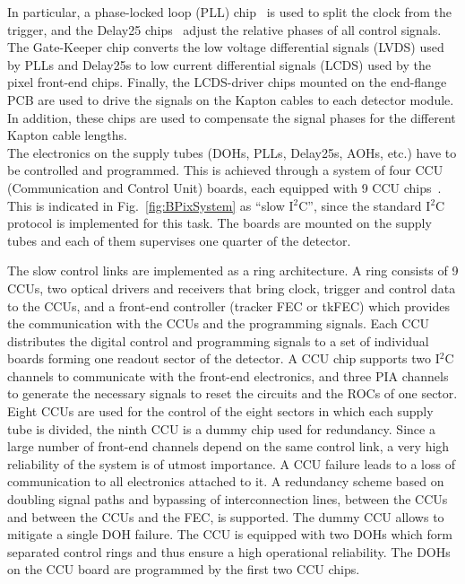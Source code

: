 In particular, a phase-locked loop (PLL) chip~\cite{PLLmanual} is used to split the clock from the trigger, and the Delay25 chips~\cite{Delay25manual} adjust the relative phases of all control signals.
The Gate-Keeper chip converts the low voltage differential signals (LVDS) used by PLLs and Delay25s to low current differential signals (LCDS) used by the pixel front-end chips.
Finally, the LCDS-driver chips mounted on the end-flange PCB are used to drive the signals on the Kapton cables to each detector module.
In addition, these chips are used to compensate the signal phases for the different Kapton cable lengths.\\

The electronics on the supply tubes (DOHs, PLLs, Delay25s, AOHs, etc.) have to be controlled and programmed.
This is achieved through a system of four CCU (Communication and Control Unit) boards, each equipped with 9 CCU chips~\cite{Paillard:593914}.
This is indicated in Fig.~\ref{fig:BPixSystem} as ``slow I$^2$C'', since the standard I$^2$C protocol is implemented for this task.
The boards are mounted on the supply tubes and each of them supervises one quarter of the detector.

The slow control links are implemented as a ring architecture.
A ring consists of 9 CCUs, two optical drivers and receivers that bring clock, trigger and control data to the CCUs,
and a front-end controller (tracker FEC or tkFEC)
which provides the communication with the CCUs and the programming signals.
Each CCU distributes the digital control and programming signals to a set of individual boards forming one readout sector of the detector.
A CCU chip supports two I$^2$C channels to communicate with the front-end electronics, and three PIA channels to generate the necessary signals to reset the circuits and the ROCs of one sector.
Eight CCUs are used for the control of the eight sectors in which each supply tube is divided, the ninth CCU is a dummy chip used for redundancy.
Since a large number of front-end channels depend on the same control link, a very high reliability of the system is of utmost importance.
A CCU failure leads to a loss of communication to all electronics attached to it.
A redundancy scheme based on doubling signal paths and bypassing of interconnection lines, between the CCUs and between the CCUs and the FEC, is supported.
The dummy CCU allows to mitigate a single DOH failure. The CCU is equipped with two DOHs which form separated control rings and thus ensure a high operational reliability.
The DOHs on the CCU board are programmed by the first two CCU chips.

